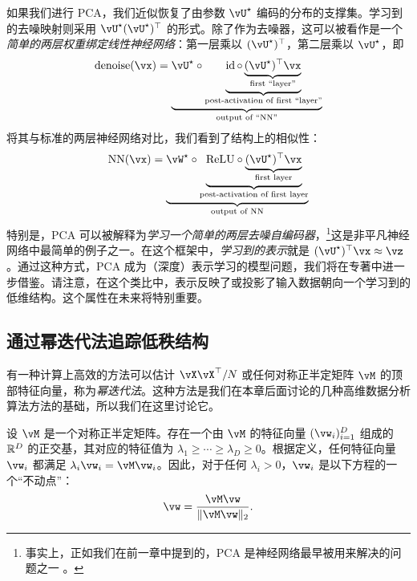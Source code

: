 \documentclass[../../book-main_zh.tex]{subfiles}
\begin{document}
\begin{remark}[神经网络解释]
    如果我们进行 PCA，我们近似恢复了由参数 \(\vU^{\star}\) 编码的分布的支撑集。学习到的去噪映射则采用 \(\vU^{\star}(\vU^{\star})^{\top}\) 的形式。除了作为去噪器，这可以被看作是一个\textit{简单的两层权重绑定线性神经网络}：第一层乘以 \((\vU^{\star})^{\top}\)，第二层乘以 \(\vU^{\star}\)，即
    \begin{equation}
        \operatorname{denoise}(\vx) = \underbrace{\vU^{\star} \circ
        \underbrace{\id \circ \underbrace{(\vU^{\star})^{\top}\vx}_{\text{first ``layer''}}}_{\text{post-activation of first ``layer''}}}_{\text{output of ``NN''}}
    \end{equation}
    将其与标准的两层神经网络对比，我们看到了结构上的相似性：
    \begin{equation}
        \operatorname{NN}(\vx) = \underbrace{\vW^{\star} \circ
        \underbrace{\mathrm{ReLU} \circ \underbrace{(\vU^{\star})^{\top}\vx}_{\text{first layer}}}_{\text{post-activation of first layer}}}_{\text{output of NN}}
    \end{equation}
    特别是，PCA 可以被解释为\textit{学习一个简单的两层去噪自编码器}，\footnote{事实上，正如我们在前一章中提到的，PCA 是神经网络最早被用来解决的问题之一 \cite{Oja1982SimplifiedNM,Baldi89}。}这是非平凡神经网络中最简单的例子之一。在这个框架中，\textit{学习到的表示}就是 \((\vU^{\star})^{\top}\vx \approx \vz\)。通过这种方式，PCA 成为（深度）表示学习的模型问题，我们将在专著中进一步借鉴。请注意，在这个类比中，表示反映了或投影了输入数据朝向一个学习到的低维结构。这个属性在未来将特别重要。
\end{remark}

\subsection{通过幂迭代法追踪低秩结构}\label{subsec:power iterations}

有一种计算上高效的方法可以估计 \(\vX\vX^{\top}/N\) 或任何对称正半定矩阵 \(\vM\) 的顶部特征向量，称为\textit{幂迭代法}。这种方法是我们在本章后面讨论的几种高维数据分析算法方法的基础，所以我们在这里讨论它。

设 \(\vM\) 是一个对称正半定矩阵。存在一个由 \(\vM\) 的特征向量 \((\vw_{i})_{i = 1}^{D}\) 组成的 \(\mathbb{R}^{D}\) 的正交基，其对应的特征值为 \(\lambda_{1} \geq \cdots \geq \lambda_{D} \geq 0\)。根据定义，任何特征向量 $\vw_i$ 都满足 $\lambda_i \vw_i = \vM \vw_i$。因此，对于任何 $\lambda_i > 0$，$\vw_i$ 是以下方程的一个“不动点”：
\begin{equation}
    \vw = \frac{\vM\vw}{\norm{\vM\vw}_{2}}.
    \label{eqn:PCA-fixed-point}
\end{equation}
\end{document}

